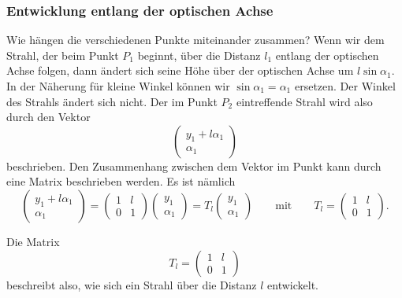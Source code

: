 \subsubsection{Entwicklung entlang der optischen Achse}
Wie hängen die verschiedenen Punkte miteinander zusammen?
Wenn wir dem Strahl, der beim Punkt $P_1$ beginnt, über die Distanz
$l_1$ entlang der optischen Achse folgen, dann ändert sich seine
Höhe über der optischen Achse um $l\sin\alpha_1$.
In der Näherung für kleine Winkel können wir $\sin\alpha_1=\alpha_1$
ersetzen.
Der Winkel des Strahls ändert sich nicht.
Der im Punkt $P_2$ eintreffende Strahl wird also durch den Vektor
\[
\begin{pmatrix}
y_1+l\alpha_1 \\\alpha_1
\end{pmatrix}
\]
beschrieben.
Den Zusammenhang zwischen dem Vektor im Punkt kann durch eine Matrix
beschrieben werden.
Es ist nämlich
\[
\begin{pmatrix}
y_1+l\alpha_1\\\alpha_1
\end{pmatrix}
=
\begin{pmatrix}
1&l\\0&1
\end{pmatrix}
\begin{pmatrix}
y_1\\\alpha_1
\end{pmatrix}
=
T_l
\begin{pmatrix}
y_1\\\alpha_1
\end{pmatrix}
\qquad
\text{mit}
\qquad
T_l
=
\begin{pmatrix}
1&l\\0&1
\end{pmatrix}.
\]

\begin{definition}
Die Matrix
\begin{equation}
T_l
=
\begin{pmatrix}
1&l\\0&1
\end{pmatrix}
\end{equation}
beschreibt also, wie sich ein Strahl über die Distanz
$l$ entwickelt.
\end{definition}

